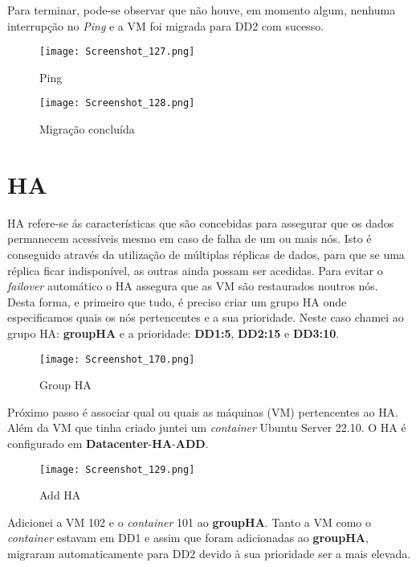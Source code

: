 Para terminar, pode-se observar que não houve, em momento algum, nenhuma interrupção no \textit{Ping} e a \ac{VM} foi migrada para DD2 com sucesso.

\begin{figure}[H]
\center
\texttt{[image: Screenshot\_127.png]}
\caption{Ping}
\end{figure}

\begin{figure}[H]
\center
\texttt{[image: Screenshot\_128.png]}
\caption{Migração concluída}
\end{figure}

\newpage
\section{HA}
\ac{HA} refere-se ás características que são concebidas para assegurar que os dados permanecem acessíveis mesmo em caso de falha de um ou mais nós. Isto é conseguido através da utilização de múltiplas réplicas de dados, para que se uma réplica ficar indisponível, as outras ainda possam ser acedidas. Para evitar o \textit{failover} automático o \ac{HA} assegura que as \ac{VM} são restaurados noutros nós.\\

Desta forma, e primeiro que tudo, é preciso criar um grupo \ac{HA} onde especificamos quais os nós pertencentes e a sua prioridade.
Neste caso chamei ao grupo \ac{HA}: \textbf{groupHA} e a prioridade: \textbf{DD1:5}, \textbf{DD2:15} e \textbf{DD3:10}.

\begin{figure}[H]
\center
\texttt{[image: Screenshot\_170.png]}
\caption{Group HA}
\end{figure}


Próximo passo é associar qual ou quais as máquinas (\ac{VM}) pertencentes ao \ac{HA}. Além da \ac{VM} que tinha criado juntei um \textit{container} Ubuntu Server 22.10.
O \ac{HA} é configurado em \textbf{Datacenter}-\textbf{HA}-\textbf{ADD}.

\begin{figure}[H]
\center
\texttt{[image: Screenshot\_129.png]}
\caption{Add HA}
\end{figure}

\newpage
Adicionei a \ac{VM} 102 e o \textit{container} 101 ao \textbf{groupHA}. Tanto a \ac{VM} como o \textit{container} estavam em DD1 e assim que foram adicionadas ao \textbf{groupHA}, migraram automaticamente para DD2 devido à sua prioridade ser a mais elevada.

